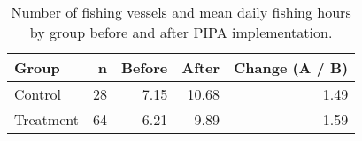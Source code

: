 \begin{table}[H]

\caption{\label{tab:}\label{tab:baci_n_s}Number of fishing vessels and mean daily fishing hours by group before and after PIPA implementation.}
\centering
\begin{tabular}[t]{lrrrr}
\toprule
Group & n & Before & After & Change (A / B)\\
\midrule
Control & 28 & 7.15 & 10.68 & 1.49\\
Treatment & 64 & 6.21 & 9.89 & 1.59\\
\bottomrule
\end{tabular}
\end{table}